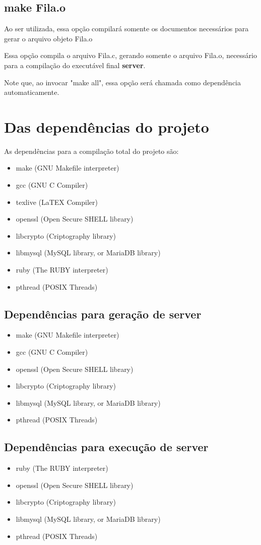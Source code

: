 \documentclass[onecolumn,12pt]{article}
\begin{document}
    	\subsection{make Fila.o}
    		Ao ser utilizada, essa opção compilará somente os documentos necessários para gerar o arquivo objeto Fila.o\par
    		Essa opção compila o arquivo Fila.c, gerando somente o arquivo Fila.o, necessário para a compilação do executável final \textbf{server}.\par
    		Note que, ao invocar "make all", essa opção será chamada como dependência automaticamente.

    \section{Das dependências do projeto}
    	As dependências para a compilação total do projeto são:
    	\begin{itemize}
    		\item make		(GNU Makefile interpreter)
    		\item gcc		(GNU C Compiler)
    		\item texlive	(LaTEX Compiler)
    		\item openssl	(Open Secure SHELL library)
    		\item libcrypto	(Criptography library)
    		\item libmysql	(MySQL library, or MariaDB library)
    		\item ruby		(The RUBY interpreter)
    		\item pthread	(POSIX Threads)
    	\end{itemize}
    	\subsection{Dependências para \textbf{geração} de \textbf{server}}
    		\begin{itemize}
    			\item make		(GNU Makefile interpreter)
    			\item gcc		(GNU C Compiler)
				\item openssl	(Open Secure SHELL library)
				\item libcrypto	(Criptography library)
				\item libmysql	(MySQL library, or MariaDB library)
				\item pthread	(POSIX Threads)
    		\end{itemize}
    	\subsection{Dependências para \textbf{execução} de \textbf{server}}
    		\begin{itemize}
    			\item ruby		(The RUBY interpreter)
				\item openssl	(Open Secure SHELL library)
				\item libcrypto	(Criptography library)
				\item libmysql	(MySQL library, or MariaDB library)
				\item pthread	(POSIX Threads)
    		\end{itemize}
\end{document}

